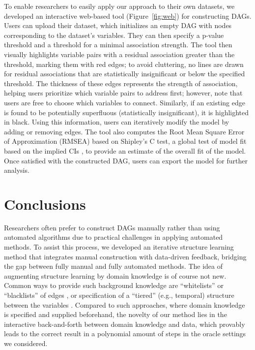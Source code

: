 \documentclass{uai2025} %
\begin{document}
To enable researchers to easily apply our approach to their own datasets, we
developed an interactive web-based tool (Figure~\ref{fig:web}) for constructing
DAGs. Users can upload their dataset, which initializes an empty DAG with nodes
corresponding to the dataset's variables. They can then specify a p-value
threshold and a threshold for a minimal association strength. The tool 
then visually highlights variable pairs
with a residual association greater than the threshold, marking them with red
edges; to avoid cluttering, no lines are drawn for residual associations that
are statistically insignificant or below the specified threshold.
The thickness of these edges represents the strength of association,
helping users prioritize which variable pairs to address first; however, note that
users are free to choose which variables to connect. Similarly, if
an existing edge is found to be potentially superfluous (statistically insignificant),
it is highlighted in black. Using this information, users can iteratively
modify the model by adding or removing edges. The tool also computes the Root
Mean Square Error of Approximation (RMSEA) based on Shipley's C test, a global test 
of model fit based on the implied CIs \citep{Shipley2000}, to provide an estimate of the
overall fit of the model. Once satisfied with the constructed DAG, users can
export the model for further analysis.

\section{Conclusions}

Researchers often prefer to construct DAGs manually rather than using automated
algorithms due to practical challenges in applying automated methods. To assist
this process, we developed an iterative structure learning method that
integrates manual construction with data-driven feedback, bridging
the gap between fully manual and fully automated methods.
The idea of augmenting structure learning by domain knowledge is of course not 
new. Common ways to provide such background knowledge are ``whitelists'' or 
``blacklists'' of edges 
\citep{scutari2010}, or specification
of a ``tiered'' (e.g., temporal) structure between the variables \citep{Bang2023}.
Compared to such approaches, where domain knowledge 
is specified and supplied beforehand, the novelty 
of our method lies in the interactive
back-and-forth between domain knowledge and data, 
which provably leads to the correct
result in a polynomial amount of steps in the oracle settings we considered.
\end{document}
